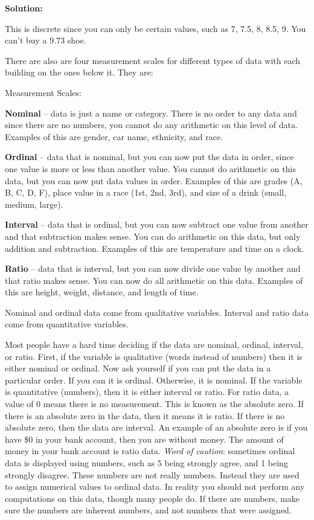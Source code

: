 \documentclass[
]{book}
\begin{document}
\textbf{Solution:}

This is discrete since you can only be certain values, such as 7, 7.5, 8, 8.5, 9. You can't buy a 9.73 shoe.

There are also are four measurement scales for different types of data with each building on the ones below it. They are:

Measurement Scales:

\textbf{Nominal} -- data is just a name or category. There is no order to any data and since there are no numbers, you cannot do any arithmetic on this level of data. Examples of this are gender, car name, ethnicity, and race.

\textbf{Ordinal} -- data that is nominal, but you can now put the data in order, since one value is more or less than another value. You cannot do arithmetic on this data, but you can now put data values in order. Examples of this are grades (A, B, C, D, F), place value in a race (1st, 2nd, 3rd), and size of a drink (small, medium, large).

\textbf{Interval} -- data that is ordinal, but you can now subtract one value from another and that subtraction makes sense. You can do arithmetic on this data, but only addition and subtraction. Examples of this are temperature and time on a clock.

\textbf{Ratio} -- data that is interval, but you can now divide one value by another and that ratio makes sense. You can now do all arithmetic on this data. Examples of this are height, weight, distance, and length of time.

Nominal and ordinal data come from qualitative variables. Interval and ratio data come from quantitative variables.

Most people have a hard time deciding if the data are nominal, ordinal, interval, or ratio. First, if the variable is qualitative (words instead of numbers) then it is either nominal or ordinal. Now ask yourself if you can put the data in a particular order. If you can it is ordinal. Otherwise, it is nominal. If the variable is quantitative (numbers), then it is either interval or ratio. For ratio data, a value of 0 means there is no measurement. This is known as the absolute zero. If there is an absolute zero in the data, then it means it is ratio. If there is no absolute zero, then the data are interval. An example of an absolute zero is if you have \$0 in your bank account, then you are without money. The amount of money in your bank account is ratio data. \emph{Word of caution}: sometimes ordinal data is displayed using numbers, such as 5 being strongly agree, and 1 being strongly disagree. These numbers are not really numbers. Instead they are used to assign numerical values to ordinal data. In reality you should not perform any computations on this data, though many people do. If there are numbers, make sure the numbers are inherent numbers, and not numbers that were assigned.
\end{document}
